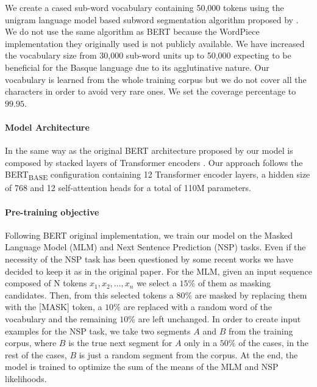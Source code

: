 \documentclass[10pt, a4paper]{article}
\begin{document}
We create a cased sub-word vocabulary containing 50,000 tokens using the unigram language model based subword segmentation algorithm proposed by . We do not use the same algorithm as BERT because the WordPiece \cite{wu2016google} implementation they originally used is not publicly available. We have increased the vocabulary size from 30,000 sub-word units up to 50,000 expecting to be beneficial for the Basque language due to its agglutinative nature. Our vocabulary is learned from the whole training corpus but we do not cover all the characters in order to avoid very rare ones. We set the coverage percentage to $99.95$. 

\paragraph{Model Architecture}

In the same way as the original BERT architecture proposed by  our model is composed by stacked layers of Transformer encoders \cite{vaswani2017attention}. Our approach follows the BERT\textsubscript{BASE} configuration containing 12 Transformer encoder layers, a hidden size of 768 and 12 self-attention heads for a total of 110M parameters. 

\paragraph{Pre-training objective}

Following BERT original implementation, we train our model on the Masked Language Model (MLM) and Next Sentence Prediction (NSP) tasks. Even if the necessity of the NSP task has been questioned by some recent works \cite{yang2019xlnet,liu2019roberta,lample2019cross} we have decided to keep it as in the original paper. For the MLM, given an input sequence composed of N tokens $x_1, x_2, ..., x_n$ we select a $15\%$ of them as masking candidates. Then, from this selected tokens a $80\%$ are masked by replacing them with the [MASK] token, a $10\%$ are replaced with a random word of the vocabulary and the remaining $10\%$ are left unchanged. In order to create input examples for the NSP task, we take two segments $A$ and $B$ from the training corpus, where $B$ is the true next segment for $A$ only in a $50\%$ of the cases, in the rest of the cases, $B$ is just a random segment from the corpus. At the end, the model is trained to optimize the sum of the means of the MLM and NSP likelihoods.
\end{document}
